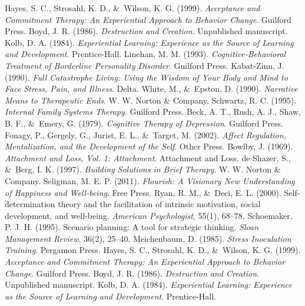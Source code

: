 \documentclass{article}
\begin{document}
\begin{thebibliography}{99}
     Hayes, S. C., Strosahl, K. D., \&\ Wilson, K. G. (1999). \textit{Acceptance and Commitment Therapy: An Experiential Approach to Behavior Change}. Guilford Press.
     Boyd, J. R. (1986). \textit{Destruction and Creation}. Unpublished manuscript.
     Kolb, D. A. (1984). \textit{Experiential Learning: Experience as the Source of Learning and Development}. Prentice-Hall.
     Linehan, M. M. (1993). \textit{Cognitive-Behavioral Treatment of Borderline Personality Disorder}. Guilford Press.
     Kabat-Zinn, J. (1990). \textit{Full Catastrophe Living: Using the Wisdom of Your Body and Mind to Face Stress, Pain, and Illness}. Delta.
     White, M., \&\ Epston, D. (1990). \textit{Narrative Means to Therapeutic Ends}. W. W. Norton \& Company.
     Schwartz, R. C. (1995). \textit{Internal Family Systems Therapy}. Guilford Press.
     Beck, A. T., Rush, A. J., Shaw, B. F., \&\ Emery, G. (1979). \textit{Cognitive Therapy of Depression}. Guilford Press.
     Fonagy, P., Gergely, G., Jurist, E. L., \&\ Target, M. (2002). \textit{Affect Regulation, Mentalization, and the Development of the Self}. Other Press.
     Bowlby, J. (1969). \textit{Attachment and Loss, Vol. 1: Attachment}. Attachment and Loss.
     de Shazer, S., \&\ Berg, I. K. (1997). \textit{Building Solutions in Brief Therapy}. W. W. Norton \& Company.
     Seligman, M. E. P. (2011). \textit{Flourish: A Visionary New Understanding of Happiness and Well-being}. Free Press.
     Ryan, R. M., \&\ Deci, E. L. (2000). Self-determination theory and the facilitation of intrinsic motivation, social development, and well-being. \textit{American Psychologist}, 55(1), 68–78.
     Schoemaker, P. J. H. (1995). Scenario planning: A tool for strategic thinking. \textit{Sloan Management Review}, 36(2), 25–40.
     Meichenbaum, D. (1985). \textit{Stress Inoculation Training}. Pergamon Press.
     Hayes, S. C., Strosahl, K. D., \&\ Wilson, K. G. (1999). \textit{Acceptance and Commitment Therapy: An Experiential Approach to Behavior Change}. Guilford Press.
     Boyd, J. R. (1986). \textit{Destruction and Creation}. Unpublished manuscript.
     Kolb, D. A. (1984). \textit{Experiential Learning: Experience as the Source of Learning and Development}. Prentice-Hall.
\end{thebibliography}
\end{document}
